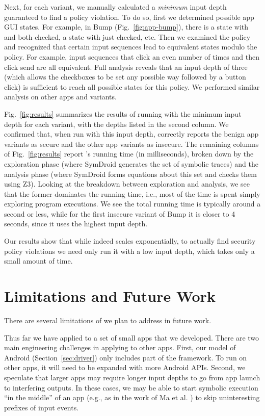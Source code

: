 Next, for each variant, we manually
calculated a \emph{minimum} input depth guaranteed
to find a policy violation.
To do so, first we determined possible app GUI states.
For example, in Bump (Fig.~\ref{fig:app-bump}), there is a state with  and
 both checked, a state with just  checked,
etc. Then we examined the policy and recognized that certain input
sequences lead to equivalent states modulo the policy.  For example,
input sequences that click  an even number of times and
then click send are all equivalent. Full analysis reveals that an
input depth of three (which allows the checkboxes to be set any
possible way followed by a button click) is
sufficient to reach all possible states for this policy. We performed
similar analysis on other apps and variants.

Fig.~\ref{fig:results} summarizes the results of running with
the minimum input depth for each variant, with the depths listed in
the second column.
We confirmed that, when run with this input depth, \toolname{}
correctly reports the benign app variants as secure and the other app
variants as insecure.
%
The remaining columns of Fig.~\ref{fig:results} report \toolname{}'s
running time (in milliseconds), broken down by the
exploration phase (where SymDroid generates the set of symbolic
traces) and the analysis phase (where SymDroid forms equations about
this set and checks them using Z3).  Looking at the breakdown between
exploration and analysis, we see that the former dominates the running
time, i.e., most of the time is spent simply exploring program
executions.  We see the total running time is typically around a
second or less, while for the first insecure variant of Bump it is
closer to 4 seconds, since it uses the highest input depth.

Our results show that while \toolname{} indeed scales exponentially,
to actually find security policy violations we need only run it with a
low input depth, which takes only a small amount of time.

\section{Limitations and Future Work}

There are several limitations of \toolname{} we plan to address
in future work.

Thus far we have applied \toolname{} to a set of small apps that we
developed. There are two main engineering challenges in applying
\toolname{} to other apps. First, our
model of Android (Section~\ref{sec:driver}) only includes part of the
framework. To run on other apps, it will need to be expanded
with more Android APIs. 
Second, we speculate
that larger apps may require longer input depths to go from app launch
to interfering outputs. In these cases, we may be able to start
symbolic execution ``in the middle'' of an app (e.g., as in the
work of Ma et al. \cite{Ma:2011}) to skip uninteresting
prefixes of input events.

